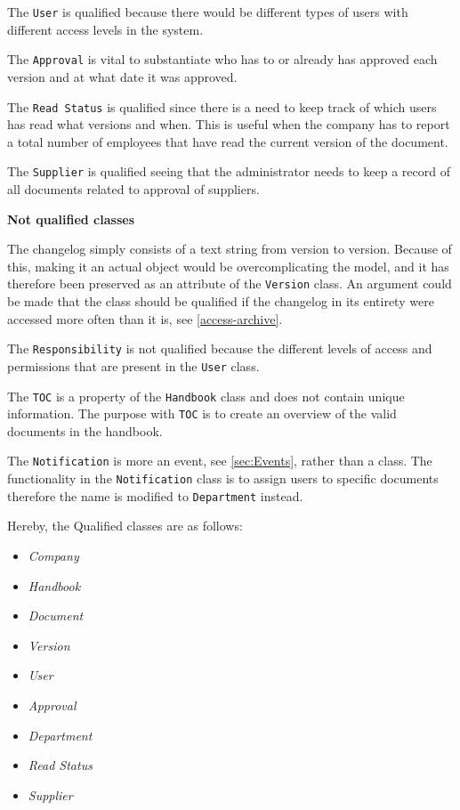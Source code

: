 The \texttt{User} is qualified because there would be different types of users with different access levels in the system.

The \texttt{Approval} is vital to substantiate who has to or already has approved each version and at what date it was approved.

The \texttt{Read Status} is qualified since there is a need to keep track of which users has read what versions and when.
This is useful when the company has to report a total number of employees that have read the current version of the document.

The \texttt{Supplier} is qualified seeing that the administrator needs to keep a record of all documents related to approval of suppliers.

\textbf{Not qualified classes}

The changelog simply consists of a text string from version to version.
Because of this, making it an actual object would be overcomplicating the model, and it has therefore been preserved as an attribute of the \texttt{Version} class.
An argument could be made that the class should be qualified if the changelog in its entirety were accessed more often than it is, see \cref{access-archive}.

The \texttt{Responsibility} is not qualified because the different levels of access and permissions that are present in the \texttt{User} class.

The \texttt{TOC} is a property of the \texttt{Handbook} class and does not contain unique information.
The purpose with \texttt{TOC} is to create an overview of the valid documents in the handbook.

The \texttt{Notification} is more an event, see \cref{sec:Events}, rather than a class.
The functionality in the \texttt{Notification} class is to assign users to specific documents therefore the name is modified to \texttt{Department} instead.

Hereby, the Qualified classes are as follows:
\begin{multicols}{4}
	\begin{itemize}
	\item \textit{Company}
	\item \textit{Handbook}
	\item \textit{Document}
	\item \textit{Version}
	\item \textit{User}
	\item \textit{Approval}
	\item \textit{Department}
	\item \textit{Read Status}
	\item \textit{Supplier}
	\end{itemize}
\end{multicols}

